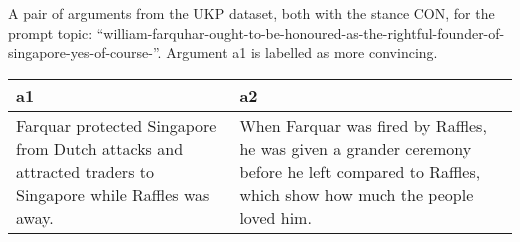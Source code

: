 \centering
\caption{A pair of arguments from the UKP dataset, both with the stance CON, for the prompt topic: ``william-farquhar-ought-to-be-honoured-as-the-rightful-founder-of-singapore-yes-of-course-''. Argument a1 is labelled as more convincing.}
\begin{tabular}{p{6cm}|p{6cm}}
\toprule
                                                                                                        a1 &                                                                                                                                                a2 \\
\midrule
 Farquar protected Singapore from Dutch attacks and attracted traders to Singapore while Raffles was away. &  When Farquar was fired by Raffles, he was given a grander ceremony before he left compared to Raffles, which show how much the people loved him. \\
\bottomrule
\end{tabular}
